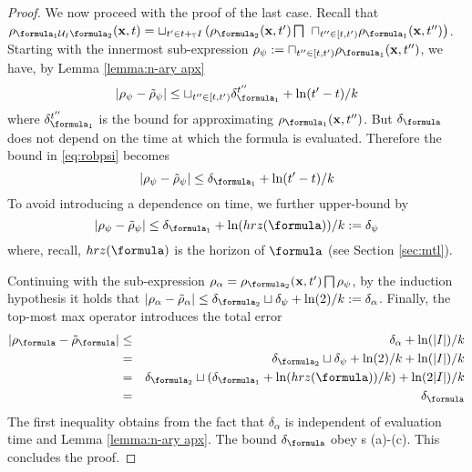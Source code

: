 \begin{proof}
We now proceed with the proof of the last case.
Recall that $\rob_{ \formula_1 \until_I \formula_2} (\sstraj,t) = \sqcup_{t' \in t+_{\TDom}I} \left(\rob_{\formula_2} (\sstraj,t') \bigsqcap \right.
\\
\left. \sqcap_{t'' \in [t,t')}   \rob_{\formula_1} (\sstraj,t'') \right)$.
Starting with the innermost sub-expression $\rob_\psi \defeq \sqcap_{t'' \in [t,t')}   \rob_{\formula_1} (\sstraj,t'')$, we have, by Lemma \ref{lemma:n-ary apx}
\begin{equation}
\label{eq:robpsi}
|\rob_{\psi}-\srob_\psi| \leq \sqcup_{t'' \in [t,t')}\delta_{\formula_1}^{t''} + \ln(t'-t)/k
\end{equation} 
where $\delta_{\formula_1}^{t''} $ is the bound for approximating $\rob_{\formula_1}(\sstraj,t'')$.
But $\delta_\formula$ does not depend on the time at which the formula is evaluated. Therefore the bound in \eqref{eq:robpsi} becomes
\begin{equation*}
|\rob_{\psi}-\srob_\psi| \leq \delta_{\formula_1} + \ln(t'-t)/k
\end{equation*} 
%
To avoid introducing a dependence on time, we further upper-bound by 
\begin{equation*}
|\rob_{\psi}-\srob_\psi| \leq \delta_{\formula_1} + \ln(hrz(\formula))/k \defeq \delta_\psi
\end{equation*} 
where, recall, $hrz(\formula)$ is the horizon of $\formula$ (see Section \ref{sec:mtl}).

Continuing with the sub-expression $\rob_\alpha = \rob_{\formula_2} (\sstraj,t') \bigsqcap \rob_\psi$, by the induction hypothesis it holds that 
$|\rob_\alpha - \srob_\alpha| \leq \delta_{\formula_2} \sqcup \delta_\psi + \ln(2)/k \defeq \delta_\alpha$.
%
Finally, the top-most max operator introduces the total error 
\begin{eqnarray*}
|\robf-\srobf| &\leq& \delta_\alpha + \ln(|I|)/k 
\\
&=& \delta_{\formula_2} \sqcup \delta_\psi + \ln(2)/k + \ln(|I|)/k 
\\
&=& \delta_{\formula_2} \sqcup ( \delta_{\formula_1} + \ln(hrz(\formula))/k )+ \ln(2|I|)/k 
\\
&=&\delta_\formula
\end{eqnarray*}
The first inequality obtains from the fact that $\delta_\alpha$ is independent of evaluation time and Lemma \ref{lemma:n-ary apx}.
The bound $\delta_\formula$ obey s (a)-(c).
This concludes the proof.
	\end{proof}